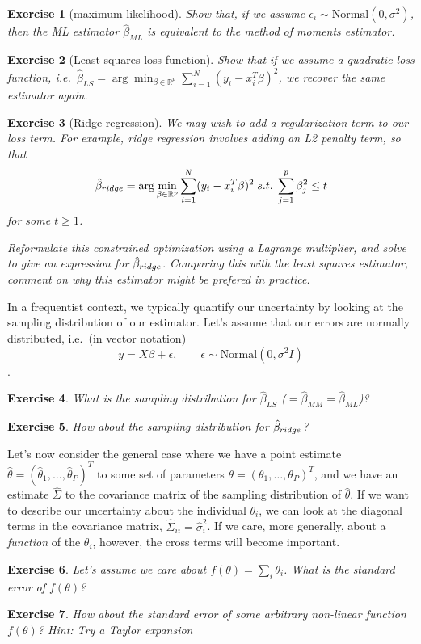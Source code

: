 \documentclass[twoside]{article}
\newcounter{lecnum}
\newtheorem{exercise}{Exercise}[lecnum]
\begin{document}
\begin{exercise}[maximum likelihood]
  Show that, if we assume $\epsilon_i\sim \mbox{Normal}(0,\sigma^2)$, then the ML estimator $\hat{\beta}_{ML}$ is equivalent to the method of moments estimator.
\end{exercise}



\begin{exercise}[Least squares loss function]
  Show that if we assume a quadratic loss function, i.e.\ $\hat{\beta}_{LS} = \arg\min_{\beta\in \mathbb{R}^p}\sum_{i=1}^N(y_i - x_i^T\beta)^2$, we recover the same estimator again.
\end{exercise}

\begin{exercise}[Ridge regression]
  We may wish to add a regularization term to our loss term. For example, ridge regression involves adding an L2 penalty term, so that
  $$\hat{\beta}_{\small{ridge}} = \arg\min_{\beta\in \mathbb{R}^p}\sum_{i=1}^N(y_i - x_i^T\beta)^2 \; s.t. \; \sum_{j=1}^p \beta_j^2 \leq t$$
  for some $t\geq 1$.

  Reformulate this constrained optimization using a Lagrange multiplier, and solve to give an expression for $\hat{\beta}_{\small{ridge}}$. Comparing this with the least squares estimator, comment on why this estimator might be prefered in practice.
\end{exercise}

  


In a frequentist context, we typically quantify our uncertainty by looking at the sampling distribution of our estimator. Let's assume that our errors are normally distributed, i.e.\ (in vector notation)
$$y = X\beta+\epsilon,\qquad \epsilon \sim \mbox{Normal}(0,\sigma^2 I)$$.

\begin{exercise}
  What is the sampling distribution for $\hat{\beta}_{LS}$ ($=\hat{\beta}_{MM}=\hat{\beta}_{ML}$)?
\end{exercise}

\begin{exercise}
  How about the sampling distribution for $\hat{\beta}_{\small{ridge}}$?
\end{exercise}


Let's now consider the general case where we have a point estimate $\hat{\theta} = (\hat{\theta}_1,\dots, \hat{\theta}_P)^T$ to some set of parameters $\theta = (\theta_1,\dots,\theta_P)^T$, and we have an estimate $\hat{\Sigma}$ to the covariance matrix of the sampling distribution of $\hat{\theta}$. If we want to describe our uncertainty about the individual $\theta_i$, we can look at the diagonal terms in the covariance matrix, $\hat{\Sigma}_{ii} = \hat{\sigma}_i^2$. If we care, more generally, about a \textit{function} of the $\theta_i$, however, the cross terms will become important.

\begin{exercise}
  Let's assume we care about $f(\theta) = \sum_i \theta_i$. What is the standard error of $f(\theta)$?
\end{exercise}

\begin{exercise}
  How about the standard error of some arbitrary non-linear function $f(\theta)$? \textit{Hint: Try a Taylor expansion}
\end{exercise}
\end{document}
